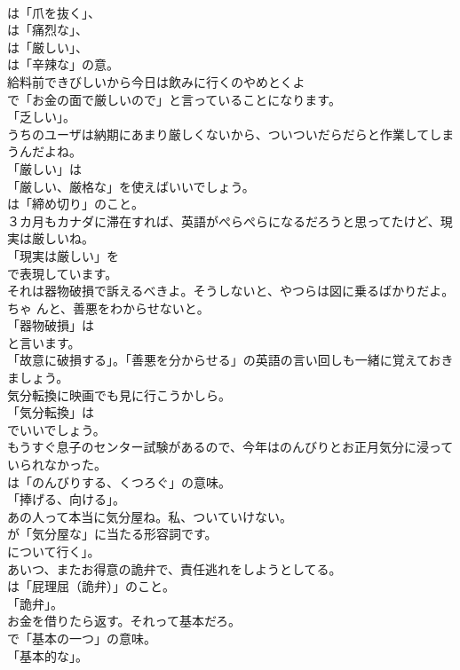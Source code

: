 \documentclass[8pt]{extreport}
\begin{document}
\begin{CJK}{UTF8}{min}
\\	は「爪を抜く」、
\\	は「痛烈な」、
\\	は「厳しい」、
\\	は「辛辣な」の意。	
\\	給料前できびしいから今日は飲みに行くのやめとくよ 
\\	で「お金の面で厳しいので」と言っていることになります。
\\	「乏しい」。	
\\	うちのユーザは納期にあまり厳しくないから、ついついだらだらと作業してしまうんだよね。 
\\	「厳しい」は
\\	「厳しい、厳格な」を使えばいいでしょう。
\\	は「締め切り」のこと。	
\\	３カ月もカナダに滞在すれば、英語がぺらぺらになるだろうと思ってたけど、現実は厳しいね。 
\\	「現実は厳しい」を 
\\	で表現しています。	
\\	それは器物破損で訴えるべきよ。そうしないと、やつらは図に乗るばかりだよ。ちゃ んと、善悪をわからせないと。 
\\	「器物破損」は
\\	と言います。
\\	「故意に破損する」。「善悪を分からせる」の英語の言い回しも一緒に覚えておきましょう。	
\\	気分転換に映画でも見に行こうかしら。 
\\	「気分転換」は
\\	でいいでしょう。	
\\	もうすぐ息子のセンター試験があるので、今年はのんびりとお正月気分に浸っていられなかった。 
\\	は「のんびりする、くつろぐ」の意味。
\\	「捧げる、向ける」。	
\\	あの人って本当に気分屋ね。私、ついていけない。 
\\	が「気分屋な」に当たる形容詞です。
\\	について行く」。	
\\	あいつ、またお得意の詭弁で、責任逃れをしようとしてる。 
\\	は「屁理屈（詭弁）」のこと。
\\	「詭弁」。	
\\	お金を借りたら返す。それって基本だろ。 
\\	で「基本の一つ」の意味。
\\	「基本的な」。	

\end{CJK}
\end{document}
